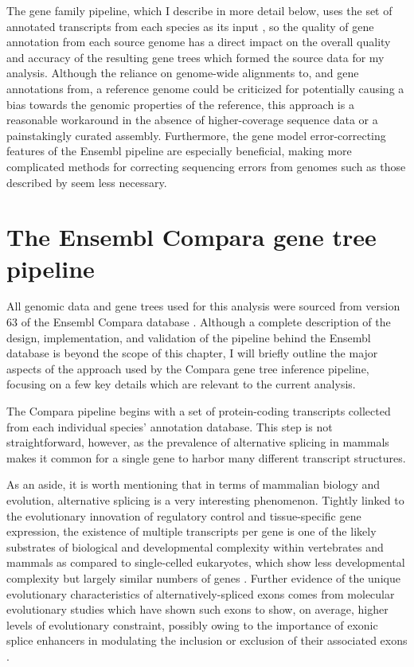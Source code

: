 The \cmp gene family pipeline, which I describe in more detail below,
uses the set of annotated transcripts from each species as its input
\citep{Vilella2009}, so the quality of gene annotation from each
source genome has a direct impact on the overall quality and accuracy
of the resulting gene trees which formed the source data for my
analysis. Although the reliance on genome-wide alignments to, and gene
annotations from, a reference genome could be criticized for
potentially causing a bias towards the genomic properties of the
reference, this approach is a reasonable workaround in the absence of
higher-coverage sequence data or a painstakingly curated
assembly. Furthermore, the gene model error-correcting features of the
Ensembl pipeline are especially beneficial, making more complicated
methods for correcting sequencing errors from \lcv genomes such as
those described by \citep{Hubisz2011} seem less necessary.

\section{The Ensembl Compara gene tree pipeline}
\label{sec_compara_pipeline}

All genomic data and gene trees used for this analysis were sourced
from version 63 of the Ensembl Compara database
\citep{Vilella2009,Flicek2011}. Although a complete description of the
design, implementation, and validation of the pipeline behind the
Ensembl database is beyond the scope of this chapter, I will briefly
outline the major aspects of the approach used by the Compara gene
tree inference pipeline, focusing on a few key details which are
relevant to the current analysis.

The Compara pipeline begins with a set of protein-coding transcripts
collected from each individual species' annotation database. This step
is not straightforward, however, as the prevalence of alternative
splicing in \euth mammals makes it common for a single gene to harbor
many different transcript structures.

As an aside, it is worth mentioning that in terms of mammalian biology
and evolution, alternative splicing is a very interesting
phenomenon. Tightly linked to the evolutionary innovation of
regulatory control and tissue-specific gene expression, the existence
of multiple transcripts per gene is one of the likely substrates of
biological and developmental complexity within vertebrates and mammals
as compared to single-celled eukaryotes, which show less developmental
complexity but largely similar numbers of genes
\citep{Csuros2011}. Further evidence of the unique evolutionary
characteristics of alternatively-spliced exons comes from molecular
evolutionary studies which have shown such exons to show, on average,
higher levels of evolutionary constraint, possibly owing to the
importance of exonic splice enhancers in modulating the inclusion or
exclusion of their associated exons \citep{Parmley2006}.

